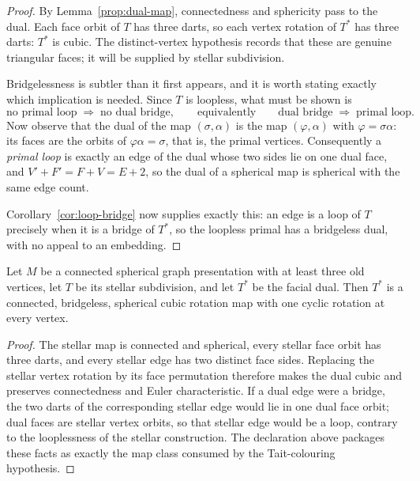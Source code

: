 \begin{proof}
By Lemma~\ref{prop:dual-map}, connectedness and sphericity pass to the dual.
Each face orbit of $T$ has three darts, so each vertex rotation of $T^{*}$ has
three darts: $T^{*}$ is cubic.  The distinct-vertex hypothesis records that
these are genuine triangular faces; it will be supplied by stellar
subdivision.

Bridgelessness is subtler than it first appears, and it is worth stating
exactly which implication is needed. Since $T$ is loopless,
what must be shown is
\[
  \text{no primal loop} \;\Longrightarrow\; \text{no dual bridge},
  \qquad\text{equivalently}\qquad
  \text{dual bridge} \;\Longrightarrow\; \text{primal loop}.
\]
Now observe that the dual of the map $(\sigma, \alpha)$ is the map
$(\varphi, \alpha)$ with $\varphi = \sigma\alpha$: its faces are the orbits
of $\varphi\alpha = \sigma$, that is, the primal vertices. Consequently a
\emph{primal loop} is exactly an edge of the dual whose two sides lie on one
dual face, and $V' + F' = F + V = E + 2$, so the dual of a spherical map is
spherical with the same edge count.

Corollary~\ref{cor:loop-bridge} now supplies exactly this: an edge is a loop
of $T$ precisely when it is a bridge of $T^{*}$, so the loopless primal has a
bridgeless dual, with no appeal to an embedding.
\end{proof}

\begin{corollary}
\label{cor:stellar-dual-package}
Let $M$ be a connected spherical graph presentation with at least three old
vertices, let $T$ be its stellar subdivision, and let $T^{*}$ be the facial
dual.  Then $T^{*}$ is a connected, bridgeless, spherical cubic rotation map
with one cyclic rotation at every vertex.
\end{corollary}

\begin{proof}
The stellar map is connected and spherical, every stellar face orbit has
three darts, and every stellar edge has two distinct face sides.  Replacing
the stellar vertex rotation by its face permutation therefore makes the dual
cubic and preserves connectedness and Euler characteristic.  If a dual edge
were a bridge, the two darts of the corresponding stellar edge would lie in
one dual face orbit; dual faces are stellar vertex orbits, so that stellar
edge would be a loop, contrary to the looplessness of the stellar
construction.  The declaration above packages these facts as exactly the
map class consumed by the Tait-colouring hypothesis.
\end{proof}


